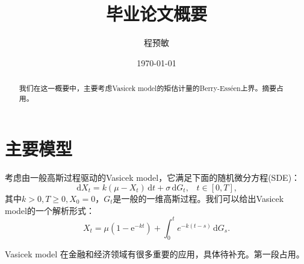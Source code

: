 \documentclass[reqno,a4paper,12pt]{amsart}
\title{\textbf{毕业论文概要}}
\author{程预敏}
\date{\today}
\newcommand\me{\mathrm{e}}
\newcommand\dif{\,\mathrm{d}}
\begin{document}
\begin{abstract}
    我们在这一概要中，主要考虑Vasicek model的矩估计量的Berry-Ess\'{e}en上界。摘要占用。
\end{abstract}
\maketitle


\section{主要模型}
考虑由一般高斯过程驱动的Vasicek model，它满足下面的随机微分方程(SDE)：
\begin{equation}
    \dif X_t=k(\mu -X_t)\dif t+\sigma \dif G_t,\;\;\; t\in[0,T],
    \label{Vmdif}
\end{equation}
其中$k>0,T\geq 0,X_0=0$，$G_t$是一般的一维高斯过程。我们可以给出Vasicek model的一个解析形式：
\begin{equation}
    X_t=\mu(1-\me^{-kt})+\int^t_0 e^{-k(t-s)}\dif G_s.
    \label{Vmexp}
\end{equation}

Vasicek model 在金融和经济领域有很多重要的应用，具体待补充。第一段占用。
\end{document}
